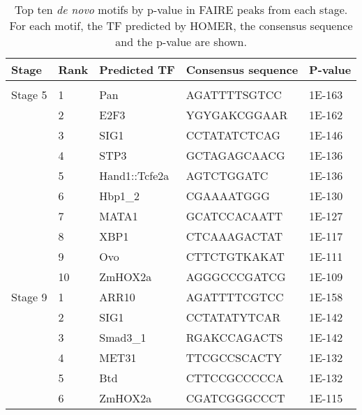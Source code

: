 \begin{center}
\begin{longtable}{|l|l|l|l|l|}
\hline
\textbf{Stage}    & \textbf{Rank} & \textbf{Predicted TF}  & \textbf{Consensus sequence} & \textbf{P-value} \\ \hline
\endfirsthead

\caption[Top ten \emph{de novo} motifs by p-value in FAIRE peaks from each stage. For each motif, the TF predicted by HOMER, the consensus sequence and the p-value are shown.]{Top ten \emph{de novo} motifs by p-value in FAIRE peaks from each stage. For each motif, the TF predicted by HOMER, the consensus sequence and the p-value are shown.} \label{Table 6.4} \\
\endlastfoot

Stage 5  & 1    & Pan           & AGATTTTSGTCC       & 1E-163  \\ \hline
         & 2    & E2F3          & YGYGAKCGGAAR       & 1E-162  \\ \hline
         & 3    & SIG1          & CCTATATCTCAG       & 1E-146  \\ \hline
         & 4    & STP3          & GCTAGAGCAACG       & 1E-136  \\ \hline
         & 5    & Hand1::Tcfe2a & AGTCTGGATC         & 1E-136  \\ \hline
         & 6    & Hbp1\_2       & CGAAAATGGG         & 1E-130  \\ \hline
         & 7    & MATA1         & GCATCCACAATT       & 1E-127  \\ \hline
         & 8    & XBP1          & CTCAAAGACTAT       & 1E-117  \\ \hline
         & 9    & Ovo           & CTTCTGTKAKAT       & 1E-111  \\ \hline
         & 10   & ZmHOX2a       & AGGGCCCGATCG       & 1E-109  \\ \hline
Stage 9  & 1    & ARR10         & AGATTTTCGTCC       & 1E-158  \\ \hline
         & 2    & SIG1          & CCTATATYTCAR       & 1E-142  \\ \hline
         & 3    & Smad3\_1      & RGAKCCAGACTS       & 1E-142  \\ \hline
         & 4    & MET31         & TTCGCCSCACTY       & 1E-132  \\ \hline
         & 5    & Btd           & CTTCCGCCCCCA       & 1E-132  \\ \hline
         & 6    & ZmHOX2a       & CGATCGGGCCCT       & 1E-115  \\ \hline

\end{longtable}
\end{center}
